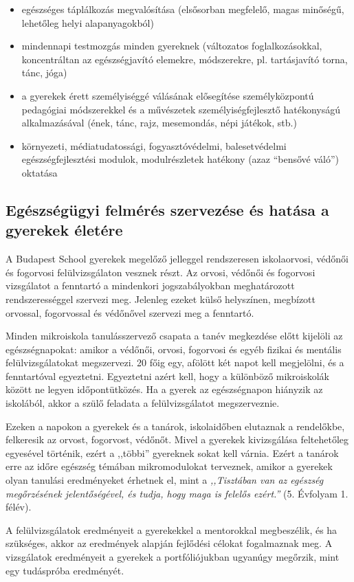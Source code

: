 \begin{itemize}

    \item
          egészséges táplálkozás megvalósítása (elsősorban megfelelő, magas minőségű, lehetőleg helyi alapanyagokból)
    \item
          mindennapi testmozgás minden gyereknek (változatos foglalkozásokkal, koncentráltan az egészségjavító elemekre, módszerekre, pl. tartásjavító torna, tánc, jóga)
    \item
          a gyerekek érett személyiséggé válásának elősegítése személyközpontú pedagógiai módszerekkel és a művészetek személyiségfejlesztő hatékonyságú alkalmazásával (ének, tánc, rajz, mesemondás, népi játékok, stb.)
    \item
          környezeti, médiatudatossági, fogyasztóvédelmi,
          balesetvédelmi\linebreak
          egészségfejlesztési modulok, modulrészletek hatékony (azaz ``bensővé váló'') oktatása
\end{itemize}

\subsection{Egészségügyi felmérés szervezése és hatása a gyerekek életére}
A Budapest School gyerekek megelőző jelleggel rendszeresen iskolaorvosi, védőnői és fogorvosi felülvizsgálaton vesznek részt.  Az orvosi, védőnői és fogorvosi vizsgálatot a fenntartó a mindenkori jogszabályokban meghatározott rendszerességgel szervezi meg. Jelenleg ezeket külső helyszínen, megbízott orvossal, fogorvossal és védőnővel szervezi meg a fenntartó.
 
Minden mikroiskola tanulásszervező csapata a tanév megkezdése előtt kijelöli az egészségnapokat: amikor a védőnői, orvosi, fogorvosi és egyéb fizikai és mentális felülvizsgálatokat megszervezi. 20 főig egy, afölött két napot kell megjelölni, és a fenntartóval egyeztetni. Egyeztetni azért kell, hogy a különböző mikroiskolák között ne legyen időpontütközés. Ha a gyerek az egészségnapon hiányzik az iskolából, akkor a szülő feladata a felülvizsgálatot megszerveznie.
 
Ezeken a napokon a gyerekek és a tanárok, iskolaidőben elutaznak a rendelőkbe, felkeresik az orvost, fogorvost, védőnőt. Mivel a gyerekek kivizsgálása feltehetőleg egyesével történik, ezért a ,,többi” gyereknek sokat kell várnia. Ezért a tanárok erre az időre egészség témában mikromodulokat terveznek, amikor a gyerekek olyan tanulási eredményeket érhetnek el, mint a \emph{,,Tisztában van az egészség megőrzésének jelentőségével, és tudja, hogy maga is felelős ezért.''} (5. Évfolyam 1. félév).
 
A felülvizsgálatok eredményeit a gyerekekkel a mentorokkal megbeszélik, és ha szükséges, akkor az eredmények alapján fejlődési célokat fogalmaznak meg. A vizsgálatok eredményeit a gyerekek a portfóliójukban ugyanúgy megőrzik, mint egy tudáspróba eredményét.
 
